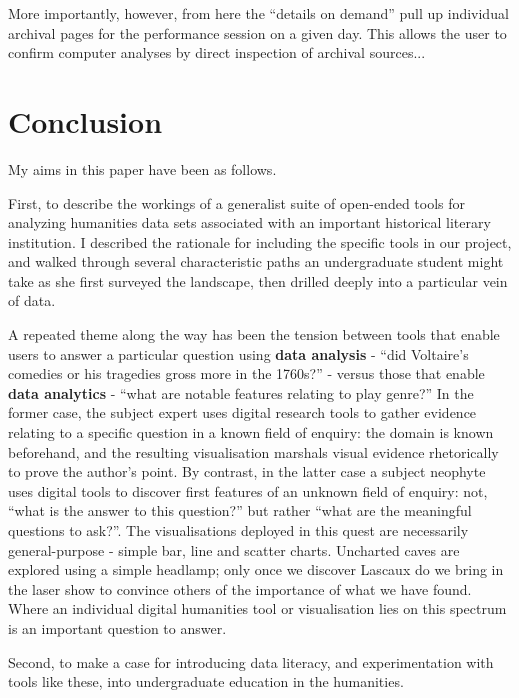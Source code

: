 \documentclass[	DIV=calc,%
							paper=a4,%
							fontsize=11pt,%
							twocolumn]{scrartcl}	 					%
\begin{document}
More importantly, however, from here the ``details on demand'' pull up individual archival pages for the performance session on a given day.  This allows the user to confirm computer analyses by direct inspection of archival sources...

\section*{Conclusion}

My aims in this paper have been as follows.

First, to describe the workings of a generalist suite of open-ended tools for analyzing humanities data sets associated with an important historical literary institution.  I described the rationale for including the specific tools in our project, and walked through several characteristic paths an undergraduate student might take as she first surveyed the landscape, then drilled deeply into a particular vein of data.

A repeated theme along the way has been the tension between tools that enable users to answer a particular question using \textbf{data analysis} - ``did Voltaire's comedies or his tragedies gross more in the 1760s?'' - versus those that enable \textbf{data analytics} - ``what are notable features relating to play genre?''  In the former case, the subject expert uses digital research tools to gather evidence relating to a specific question in a known field of enquiry: the domain is known beforehand, and the resulting visualisation marshals visual evidence rhetorically to prove the author's point.  By contrast, in the latter case a subject neophyte uses digital tools to discover first features of an unknown field of enquiry: not, ``what is the answer to this question?'' but rather ``what are the meaningful questions to ask?''.  The visualisations deployed in this quest are necessarily general-purpose - simple bar, line and scatter charts.  Uncharted caves are explored using a simple headlamp; only once we discover Lascaux do we bring in the laser show to convince others of the importance of what we have found.  Where an individual digital humanities tool or visualisation lies on this spectrum is an important question to answer.

Second, to make a case for introducing data literacy, and experimentation with tools like these, into undergraduate education in the humanities.
\end{document}
